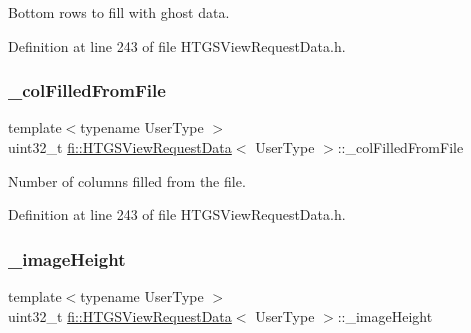 Bottom rows to fill with ghost data. 



Definition at line 243 of file H\+T\+G\+S\+View\+Request\+Data.\+h.

\mbox{\label{classfi_1_1HTGSViewRequestData_ac78802f9e701d9f0ce98f4901362e36f}} 
\subsubsection{\texorpdfstring{\+\_\+col\+Filled\+From\+File}{\_colFilledFromFile}}
{\footnotesize\ttfamily template$<$typename User\+Type $>$ \\
uint32\+\_\+t \hyperlink{classfi_1_1HTGSViewRequestData}{fi\+::\+H\+T\+G\+S\+View\+Request\+Data}$<$ User\+Type $>$\+::\+\_\+col\+Filled\+From\+File\hspace{0.3cm}{\ttfamily [private]}}



Number of columns filled from the file. 



Definition at line 243 of file H\+T\+G\+S\+View\+Request\+Data.\+h.

\mbox{\label{classfi_1_1HTGSViewRequestData_a59bbd65badee901cce6b56b409ebd4e9}} 
\subsubsection{\texorpdfstring{\+\_\+image\+Height}{\_imageHeight}}
{\footnotesize\ttfamily template$<$typename User\+Type $>$ \\
uint32\+\_\+t \hyperlink{classfi_1_1HTGSViewRequestData}{fi\+::\+H\+T\+G\+S\+View\+Request\+Data}$<$ User\+Type $>$\+::\+\_\+image\+Height\hspace{0.3cm}{\ttfamily [private]}}



